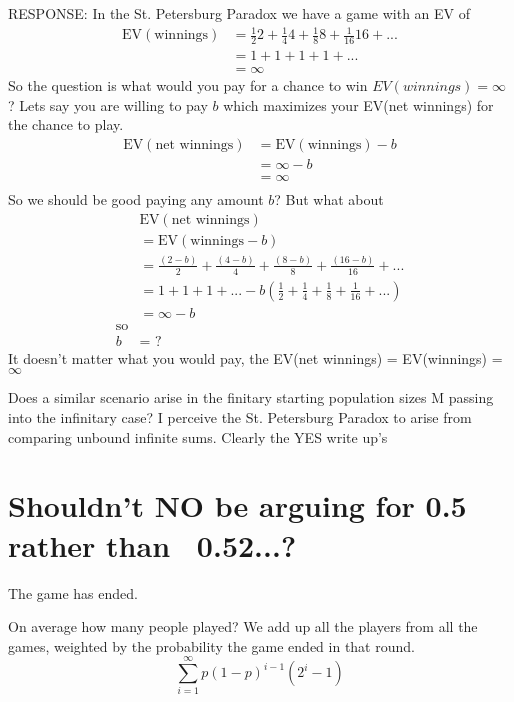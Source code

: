 \documentclass[12pt, letterpaper]{article}
\begin{document}
RESPONSE: 
        In the St. Petersburg Paradox we have a game with an EV of
        \begin{align*}
            \text{EV}(\text{winnings})&=\frac{1}{2}2 + \frac{1}{4}4 + \frac{1}{8}8 + \frac{1}{16}16 + ...\\
            &=1 + 1 + 1 + 1 + ...\\
            &=\infty
        \end{align*}
        So the question is what would you pay for a chance to win $EV(winnings)=\infty$?  Lets say you are willing to pay $b$ which maximizes your EV(net winnings) for the chance to play.
        \begin{align*}
            \text{EV}(\text{net winnings})&=\text{EV}(\text{winnings})-b\\ 
             &=\infty-b \\
             &= \infty\\
        \end{align*}
        So we should be good paying any amount $b$? But what about
        \begin{align*}
             &\text{EV}(\text{net winnings})\\
             &=\text{EV}(\text{winnings}-b)\\ 
            & =\frac{(2-b)}{2} + \frac{(4-b)}{4} + \frac{(8-b)}{8} + \frac{(16-b)}{16} + ...\\
            & =1 + 1 + 1 + ... -b(\frac{1}{2}+\frac{1}{4}+\frac{1}{8}+\frac{1}{16}+...)\\
            & =\infty-b\\
            \text{so}\\
           b & = \text{  ?  }
        \end{align*}
        It doesn't matter what you would pay, the EV(net winnings) = EV(winnings) = $\infty$

        Does a similar scenario arise in the finitary starting population sizes M passing into the infinitary case?  I perceive the St. Petersburg Paradox to arise from comparing unbound infinite sums. Clearly the YES write up's 

\section{Shouldn't NO be arguing for 0.5 rather than ~0.52...?}
The game has ended. 

On average how many people played?
We add up all the players from all the games, weighted by the probability the game ended in that round.
$$\sum_{i=1}^\infty p(1-p)^{i-1}(2^i-1)$$
\end{document}
